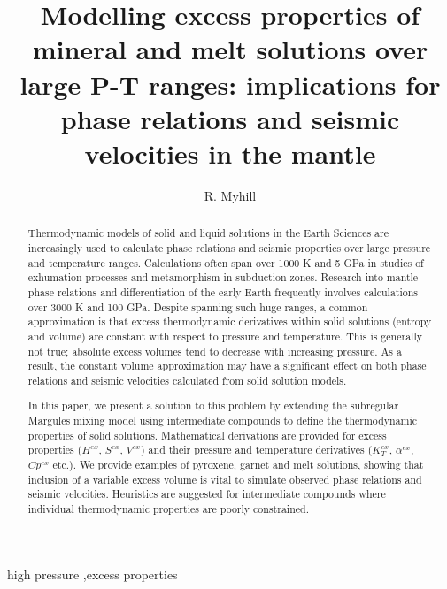 \documentclass[review]{elsarticle}
\begin{document}
\begin{frontmatter}

\title{Modelling excess properties of mineral and melt solutions over large P-T ranges: implications for phase relations and seismic velocities in the mantle}

\author{R. Myhill}
\address{Bayerisches Geoinstitut, Universit\"{a}t Bayreuth, Universit\"{a}tsstrasse 30, 95447 Bayreuth, Germany}

\begin{abstract}
  Thermodynamic models of solid and liquid solutions in the Earth Sciences are increasingly used to calculate phase relations and seismic properties over large pressure and temperature ranges. Calculations often span over 1000 K and 5 GPa in studies of exhumation processes and metamorphism in subduction zones. Research into mantle phase relations and differentiation of the early Earth frequently involves calculations over 3000 K and 100 GPa. Despite spanning such huge ranges, a common approximation is that excess thermodynamic derivatives within solid solutions (entropy and volume) are constant with respect to pressure and temperature. This is generally not true; absolute excess volumes tend to decrease with increasing pressure. As a result, the constant volume approximation may have a significant effect on both phase relations and seismic velocities calculated from solid solution models.

  In this paper, we present a solution to this problem by extending the subregular Margules mixing model using intermediate compounds to define the thermodynamic properties of solid solutions. Mathematical derivations are provided for excess properties ($H^{ex}$, $S^{ex}$, $V^{ex}$) and their pressure and temperature derivatives ($K_T^{ex}$, $\alpha^{ex}$, $Cp^{ex}$ etc.). We provide examples of pyroxene, garnet and melt solutions, showing that inclusion of a variable excess volume is vital to simulate observed phase relations and seismic velocities. Heuristics are suggested for intermediate compounds where individual thermodynamic properties are poorly constrained.


\end{abstract}

\begin{keyword}
high pressure \sep excess properties
\end{keyword}

\end{frontmatter}
\end{document}
